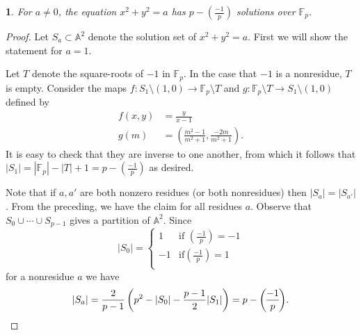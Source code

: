 \documentclass[10pt,a4paper]{amsart}
\numberwithin{equation}{section}
\numberwithin{figure}{section}
\theoremstyle{definition}
\theoremstyle{remark}
\theoremstyle{plain}
\theoremstyle{plain}
\theoremstyle{definition}
\theoremstyle{plain}
\newtheorem{prop}{\protect\propositionname}[section]
\theoremstyle{plain}
\providecommand{\propositionname}{Proposition}
\newcommand{\legendre}[2]{\genfrac{(}{)}{}{}{#1}{#2}}
\newcommand{\F}{\mathbb{F}}
\begin{document}
	\begin{prop}\label{prop:circle-solutions} 
		For $a \neq 0$, the equation $x^2 + y^2 = a$ has $p - \legendre{-1}{p}$ 
		solutions over $\F_p$.
	\end{prop} 
	\begin{proof} 
		Let $S_a \subset \mathbb{A}^2$ denote the solution set of $x^2 + y^2 = a$. 
		First we will show the statement for $a=1$.
		
		Let $T$ denote the square-roots of $-1$ in $\F_p$. In the case
		that $-1$ is a nonresidue, $T$ is empty. Consider the maps $f\colon S_1
		\setminus (1,0) \to \F_p \setminus T$ and $g\colon \F_p
		\setminus T \to S_1 \setminus (1,0)$ defined by 
		\begin{align*} 
		f(x,y) &= \frac{y}{x-1} \\ 
		g(m) &= \left(\frac{m^2 - 1}{m^2 + 1}, \frac{-2m}{m^2 + 1}\right).
		\end{align*} 
		It is easy to check that they are inverse to one
		another, from which it follows that $|S_1| = |\F_p| - |T| + 1 = p -
		\legendre{-1}{p}$ as desired.
		
		Note that if $a,a'$ are both nonzero residues (or both nonresidues)
		then $|S_a| = |S_{a'}|$. From the preceding, we have the claim for all residues
		$a$. Observe that $S_0 \cup \cdots \cup S_{p-1}$ gives a partition of
		$\mathbb{A}^2$. Since 
		\[ |S_0| = \begin{cases}
		1 & \text{if } \legendre{-1}{p} = -1 \\
		-1 & \text{if} \legendre{-1}{p} = 1 \\
		\end{cases} \] 
		for a nonresidue $a$ we have 
		\[ |S_a| = \frac{2}{p-1} 
		\left(p^2 - |S_0| - \frac{p-1}{2}|S_1|\right) = 
		p - \legendre{-1}{p}. \qedhere \] 
	\end{proof}
	
\end{document}
